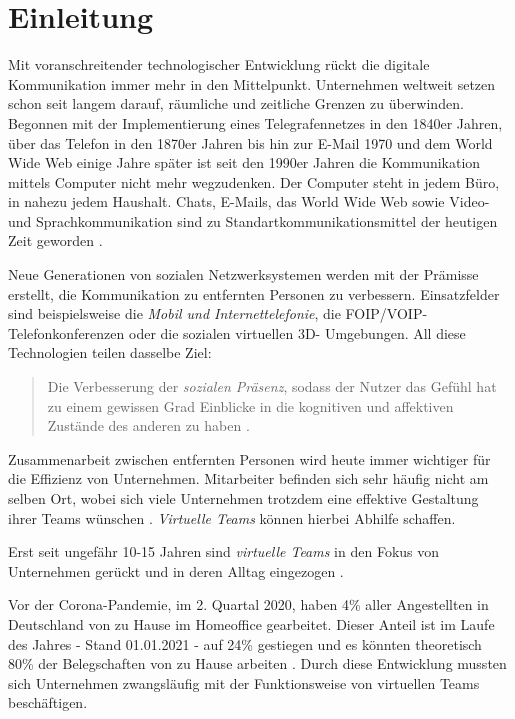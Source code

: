 \documentclass[a4paper,11pt]{article}%
\renewcommand{\\}{\vspace*{0.5\baselineskip} \newline}
\begin{document}
\section*{Einleitung}
	Mit voranschreitender technologischer Entwicklung rückt die digitale Kommunikation immer mehr in den Mittelpunkt. Unternehmen weltweit setzen schon seit langem darauf, räumliche und zeitliche Grenzen zu überwinden. Begonnen mit der Implementierung eines Telegrafennetzes in den 1840er Jahren, über das Telefon in den 1870er Jahren bis hin zur E-Mail 1970 und dem World Wide Web einige Jahre später ist seit den 1990er Jahren die Kommunikation mittels Computer nicht mehr wegzudenken. Der Computer steht in jedem Büro, in nahezu jedem Haushalt. Chats, E-Mails, das World Wide Web sowie Video- und Sprachkommunikation sind zu Standartkommunikationsmittel der heutigen Zeit geworden \citep[p. 14-16]{thurlow2004computer}.
	
Neue Generationen von sozialen Netzwerksystemen werden mit der Prämisse erstellt, die Kommunikation zu entfernten Personen zu verbessern.
Einsatzfelder sind beispielsweise die \textit{Mobil und Internettelefonie}, die FOIP/VOIP-Telefonkonferenzen oder die sozialen virtuellen 3D- Umgebungen.
All diese Technologien teilen dasselbe Ziel: 
\begin{quote}
\glqq{}Die Verbesserung der \textit{sozialen Präsenz}, sodass der Nutzer das Gefühl hat zu einem gewissen Grad Einblicke in die kognitiven und affektiven Zustände des anderen zu haben\dq{} \citep{biocca2002defining} \citep[S. 407–447]{biocca2001plugging}.
\end{quote}

Zusammenarbeit zwischen entfernten Personen wird heute immer wichtiger für die Effizienz von Unternehmen. Mitarbeiter befinden sich sehr häufig nicht am selben Ort, wobei sich viele Unternehmen trotzdem eine effektive Gestaltung ihrer Teams wünschen \citep[S. 791-792]{jarvenpaa1999communication}. \textit{Virtuelle Teams} können hierbei Abhilfe schaffen. 
	
Erst seit ungefähr 10-15 Jahren sind \textit{virtuelle Teams} in den Fokus von Unternehmen gerückt und in deren Alltag eingezogen \citep{gilson2015virtual}.

Vor der Corona-Pandemie, im 2. Quartal 2020, haben 4\% aller Angestellten in Deutschland von zu Hause im Homeoffice gearbeitet. Dieser Anteil ist im Laufe des Jahres - Stand 01.01.2021 - auf 24\% gestiegen und es könnten theoretisch 80\% der Belegschaften von zu Hause arbeiten \citep{statistaCorona2020}. Durch diese Entwicklung mussten sich Unternehmen zwangsläufig mit der Funktionsweise von virtuellen Teams beschäftigen.
\end{document}
